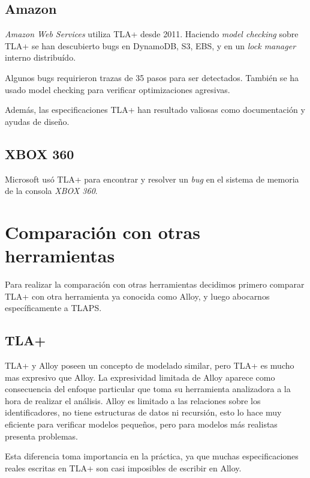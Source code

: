 \documentclass[spanish]{llncs}
\begin{document}
\subsection{Amazon}
\textit{Amazon Web Services} utiliza TLA+ desde 2011. Haciendo \textit{model checking} sobre TLA+ se han descubierto bugs
en DynamoDB, S3, EBS, y en un \textit{lock manager} interno distribuído.

Algunos bugs requirieron trazas de 35 pasos para ser detectados. También se ha usado model checking para verificar optimizaciones agresivas.

Además, las especificaciones TLA+ han resultado valiosas como documentación y ayudas de diseño.
\cite{amazon}

\subsection{XBOX 360}
Microsoft usó TLA+ para encontrar y resolver un \textit{bug} en el sistema de memoria de la consola \textit{XBOX 360}.
\cite{xbox360}


\section{Comparación con otras herramientas}
Para realizar la comparación con otras herramientas decidimos primero comparar TLA+ con otra herramienta ya conocida como Alloy,
y luego abocarnos específicamente a TLAPS.

  \subsection{TLA+}
  TLA+ y Alloy poseen un concepto de modelado similar, pero TLA+ es mucho mas expresivo que Alloy. La expresividad limitada de Alloy aparece como consecuencia del enfoque particular que toma su herramienta analizadora a la hora de realizar el análisis. Alloy es limitado a las relaciones sobre los identificadores, no tiene estructuras de datos ni recursión, esto lo hace muy eficiente para verificar modelos pequeños, pero para modelos más realistas presenta problemas. 
  
  Esta diferencia toma importancia en la práctica, ya que muchas especificaciones reales escritas en TLA+ son 
  casi imposibles de escribir en Alloy.
\end{document}

